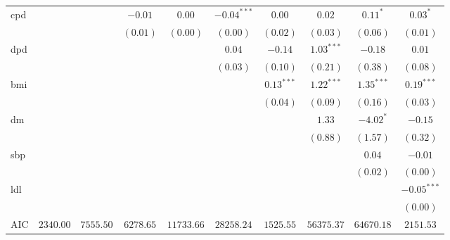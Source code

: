 \begin{tabular}{l c c c c c c c c c}
cpd              &               &               & $-0.01$       & $0.00$        & $-0.04^{***}$ & $0.00$         & $0.02$        & $0.11^{*}$     & $0.03^{*}$     \\
                 &               &               & $(0.01)$      & $(0.00)$      & $(0.00)$      & $(0.02)$       & $(0.03)$      & $(0.06)$       & $(0.01)$       \\
dpd              &               &               &               &               & $0.04$        & $-0.14$        & $1.03^{***}$  & $-0.18$        & $0.01$         \\
                 &               &               &               &               & $(0.03)$      & $(0.10)$       & $(0.21)$      & $(0.38)$       & $(0.08)$       \\
bmi              &               &               &               &               &               & $0.13^{***}$   & $1.22^{***}$  & $1.35^{***}$   & $0.19^{***}$   \\
                 &               &               &               &               &               & $(0.04)$       & $(0.09)$      & $(0.16)$       & $(0.03)$       \\
dm               &               &               &               &               &               &                & $1.33$        & $-4.02^{*}$    & $-0.15$        \\
                 &               &               &               &               &               &                & $(0.88)$      & $(1.57)$       & $(0.32)$       \\
sbp              &               &               &               &               &               &                &               & $0.04$         & $-0.01$        \\
                 &               &               &               &               &               &                &               & $(0.02)$       & $(0.00)$       \\
ldl              &               &               &               &               &               &                &               &                & $-0.05^{***}$  \\
                 &               &               &               &               &               &                &               &                & $(0.00)$       \\
\midrule
AIC              & $2340.00$     & $7555.50$     & $6278.65$     & $11733.66$    & $28258.24$    & $1525.55$      & $56375.37$    & $64670.18$     & $2151.53$      \\

\end{tabular}
